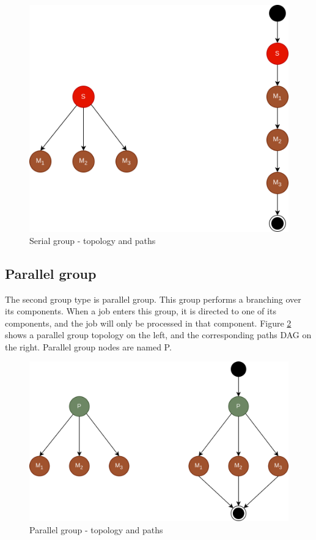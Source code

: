 \begin{figure}[!htbp]
	\centering
	\includegraphics[scale=0.3]{../images/serial_group.png}
	\caption{Serial group - topology and paths}
    \label{fig:serial_group}
\end{figure}

\subsection{Parallel group}

The second group type is parallel group. This group performs a branching over its components. When a job enters this group, it is directed to one of its components, and the job will only be processed in that component. Figure \ref{fig:parallel_group} shows a parallel group topology on the left, and the corresponding paths DAG on the right. Parallel group nodes are named P.

\begin{figure}[!htbp]
	\centering
	\includegraphics[scale=0.3]{../images/parallel_group.png}
	\caption{Parallel group - topology and paths}
    \label{fig:parallel_group}
\end{figure}

